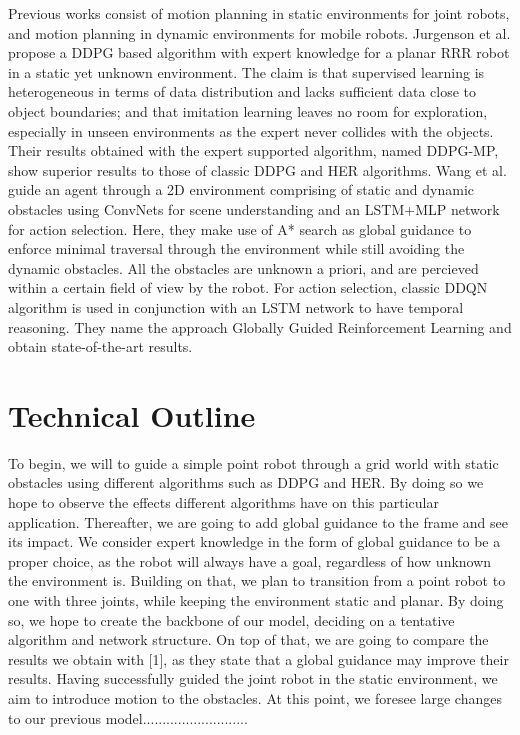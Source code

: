 \documentclass[conference]{IEEEtran}
\begin{document}
Previous works consist of motion planning in static environments for joint robots, and motion planning in dynamic environments for mobile robots. Jurgenson et al. propose a DDPG based algorithm with expert knowledge for a planar RRR robot in a static yet unknown environment. The claim is that supervised learning is heterogeneous in terms of data distribution and lacks sufficient data close to object boundaries; and that imitation learning leaves no room for exploration, especially in unseen environments as the expert never collides with the objects. Their results obtained with the expert supported algorithm, named DDPG-MP, show superior results to those of classic DDPG and HER algorithms. Wang et al. guide an agent through a 2D environment comprising of static and dynamic obstacles using ConvNets for scene understanding and an LSTM+MLP network for action selection. Here, they make use of A* search as global guidance to enforce minimal traversal through the environment while still avoiding the dynamic obstacles. All the obstacles are unknown a priori, and are percieved within a certain field of view by the robot. For action selection, classic DDQN algorithm is used in conjunction with an LSTM network to have temporal reasoning. They name the approach Globally Guided Reinforcement Learning and obtain state-of-the-art results. 

\section{Technical Outline} To begin, we will to guide a simple point robot through a grid world with static obstacles using different algorithms such as DDPG and HER. By doing so we hope to observe the effects different algorithms have on this particular application. Thereafter, we are going to add global guidance to the frame and see its impact. We consider expert knowledge in the form of global guidance to be a proper choice, as the robot will always have a goal, regardless of how unknown the environment is. Building on that, we plan to transition from a point robot to one with three joints, while keeping the environment static and planar. By doing so, we hope to create the backbone of our model, deciding on a tentative algorithm and network structure. On top of that, we are going to compare the results we obtain with [1], as they state that a global guidance may improve their results. Having successfully guided the joint robot in the static environment, we aim to introduce motion to the obstacles. At this point, we foresee large changes to our previous model...........................
\end{document}
